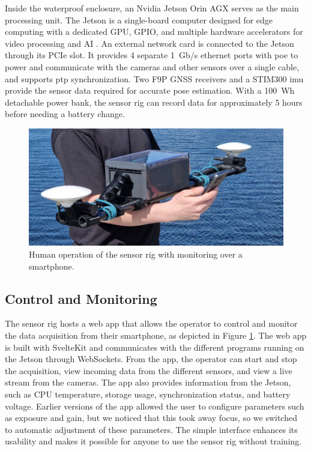 Inside the waterproof enclosure, an Nvidia Jetson Orin AGX serves as the main processing unit.
The Jetson is a single-board computer designed for edge computing with a dedicated GPU, GPIO, and multiple hardware accelerators for video processing and AI \cite{karumbunathanNVIDIAJetsonAGX2022}.
An external network card is connected to the Jetson through its PCIe slot. 
It provides 4 separate \SI{1}{Gb/s} ethernet ports with \gls{poe} to power and communicate with the cameras and other sensors over a single cable, and supports \gls{ptp} synchronization.
Two F9P GNSS receivers and a STIM300 \gls{imu} provide the sensor data required for accurate pose estimation.
With a \SI{100}{Wh} detachable power bank, the sensor rig can record data for approximately 5 hours before needing a battery change. 

\begin{figure}[H] 
    
    \centering
    \includegraphics[trim={0 2cm 0 1cm},clip,width=\textwidth]{figures/operation.jpg}
    \caption{Human operation of the sensor rig with monitoring over a smartphone. \label{fig:operation}}
\end{figure}

\subsection{Control and Monitoring}
The sensor rig hosts a web app that allows the operator to control and monitor the data acquisition from their smartphone, as depicted in Figure \ref{fig:operation}.
The web app is built with SvelteKit and communicates with the different programs running on the Jetson through WebSockets.
From the app, the operator can start and stop the acquisition, view incoming data from the different sensors, and view a live stream from the cameras.
The app also provides information from the Jetson, such as CPU temperature, storage usage, synchronization status, and battery voltage.
Earlier versions of the app allowed the user to configure parameters such as exposure and gain, but we noticed that this took away focus, so we switched to automatic adjustment of these parameters.
The simple interface enhances its usability and makes it possible for anyone to use the sensor rig without training.

